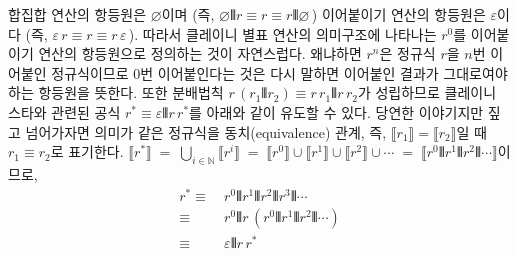 합집합 연산의 항등원은 $\varnothing$이며
(즉, $\varnothing \VERT r \equiv r \equiv r \VERT \varnothing\,$)
이어붙이기 연산의 항등원은 $\varepsilon$이다
(즉, $\varepsilon\,r \equiv r \equiv r\,\varepsilon\,$).
따라서 클레이니 별표 연산의 의미구조에 나타나는 $r^0$를
이어붙이기 연산의 항등원으로 정의하는 것이 자연스럽다.
왜냐하면 $r^n$은 정규식 $r$을 $n$번 이어붙인 정규식이므로
0번 이어붙인다는 것은 다시 말하면 이어붙인 결과가
그대로여야 하는 항등원을 뜻한다. 또한 분배법칙
$r\,(r_1 \VERT r_2) \equiv r\,r_1 \VERT r\,r_2$가 성립하므로
클레이니 스타와 관련된 공식 $r^{*} \equiv \varepsilon\VERT r\,r^{*}$를
아래와 같이 유도할 수 있다. 당연한 이야기지만 짚고 넘어가자면
의미가 같은 정규식을 동치(equivalence) 관계, 즉,
$\llbracket r_1 \rrbracket = \llbracket r_2 \rrbracket$일 때
$r_1 \equiv r_2$로 표기한다.
$\displaystyle
      \llbracket r^{*} \rrbracket
\;=\; \bigcup_{i\in\mathbb{N}}\llbracket r^i \rrbracket
\;=\; \llbracket r^0 \rrbracket \cup
      \llbracket r^1 \rrbracket \cup
      \llbracket r^2 \rrbracket \cup \cdots
\;=\; \llbracket r^0\VERT r^1\VERT r^2\VERT \cdots \rrbracket$이므로,
\vspace*{-1.5ex}
\begin{align*}
r^{*} \equiv~& r^0 \VERT r^1 \VERT r^2 \VERT r^3 \VERT \cdots
\\    \equiv~& r^0 \VERT r\,(r^0 \VERT r^1 \VERT r^2 \VERT \cdots)
\\    \equiv~& \varepsilon \VERT r\,r^{*}
\end{align*}

